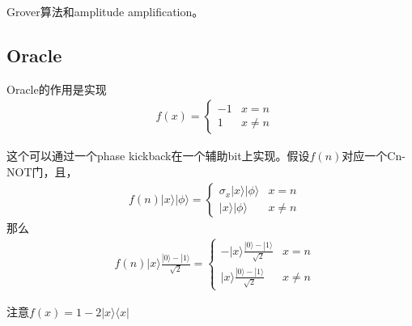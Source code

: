 Grover算法和amplitude amplification。

\subsection{Oracle}

Oracle的作用是实现
\begin{equation}
\begin{split}
&f(x)=\left\{\begin{array}{cc}-1 & x=n\\ 1 & x\neq n \end{array}\right.
\end{split}
\end{equation}

这个可以通过一个phase kickback在一个辅助bit上实现。假设$f(n)$对应一个Cn-NOT门，且，
\begin{equation}
\begin{split}
&f(n)|x\rangle |\phi\rangle =\left\{\begin{array}{cc}  \sigma _x |x\rangle |\phi\rangle & x=n\\ |x\rangle|\phi\rangle & x\neq n \end{array}\right.
\end{split}
\end{equation}
那么
\begin{equation}
\begin{split}
&f(n)|x\rangle \frac{|0\rangle -|1\rangle}{\sqrt{2}} =\left\{\begin{array}{cc}  -|x\rangle \frac{|0\rangle -|1\rangle}{\sqrt{2}} & x=n\\ |x\rangle \frac{|0\rangle -|1\rangle}{\sqrt{2}} & x\neq n \end{array}\right.
\end{split}
\end{equation}

注意$f(x)=1-2|x\rangle \langle x|$


